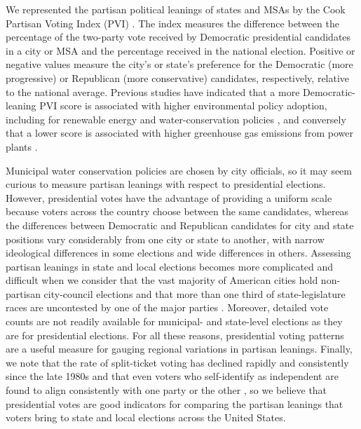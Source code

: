 \documentclass[draft,linenumbers]{agujournal}\usepackage{knitr}
\begin{document}
We represented the partisan political leanings of states and MSAs by the
Cook Partisan Voting Index (PVI) \citep{cook:pvi:2013}. The index measures
the difference between the percentage of the two-party vote received by
Democratic presidential candidates in a city or MSA and the percentage received
in the national election. Positive or negative values measure the
city's or state's preference for the Democratic (more progressive)
or Republican (more conservative) candidates,
respectively, relative to the national average.
Previous studies have indicated that a more Democratic-leaning PVI score is associated with higher environmental
policy adoption, including for renewable energy \citep{chupp:environ.voting:2011}
and water-conservation policies \citep{hess:drought:2016}, and conversely that a lower score is associated with
higher greenhouse gas emissions from power plants \citep{grant:environ.accountability:2017}.

Municipal water conservation policies are chosen by city officials, so it
may seem curious to measure partisan leanings with respect to presidential
elections. However, presidential votes have the advantage of providing a uniform
scale because voters across the country choose between the same candidates,
whereas the differences between Democratic and Republican candidates for
city and state positions vary considerably from one city or state to another,
with narrow ideological differences in some elections and wide differences in
others. Assessing partisan leanings in state and local
elections becomes more complicated and difficult when we consider that
the vast majority of American cities hold non-partisan city-council elections
\citep{svara:city.councils:2003} and that more than one third of state-legislature
races are uncontested by one of the major parties
\citep{klarner:state.elections:2015,ap:uncontested:2006}.
Moreover, detailed vote
counts are not readily available for municipal- and state-level elections as
they are for presidential elections. For all these reasons, presidential
voting patterns are a useful measure for gauging regional variations in partisan
leanings.
Finally, we note that the rate of split-ticket voting has declined rapidly
and consistently since the late 1980s \citep{fiorina:renationalization:2016}
and that even voters who self-identify as independent are found to align
consistently with one party or the other \citep{hawkins:motivated:2012},
so we believe that
presidential votes are good indicators for comparing the partisan leanings
that voters bring to state and local elections across the United States.
\end{document}
